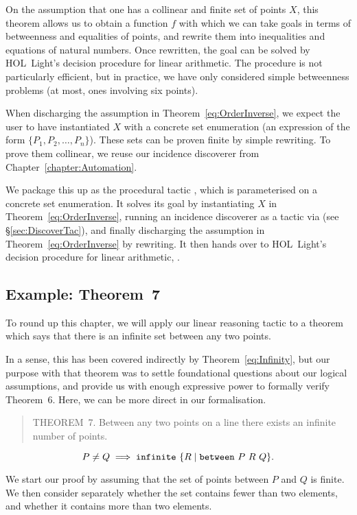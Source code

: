 On the assumption that one has a collinear and finite set of points $X$, this theorem allows us to obtain a function $f$ with which we can take goals in terms of betweenness and equalities of points, and rewrite them into inequalities and equations of natural numbers. Once rewritten, the goal can be solved by HOL~Light's decision procedure for linear arithmetic. The procedure is not particularly efficient, but in practice, we have only considered simple betweenness problems (at most, ones involving six points).

When discharging the assumption in Theorem~\ref{eq:OrderInverse}, we expect the user to have instantiated $X$ with a concrete set enumeration (an expression of the form $\{P_1,P_2,\ldots,P_n\}$). These sets can be proven finite by simple rewriting. To prove them collinear, we reuse our incidence discoverer from Chapter~\ref{chapter:Automation}.

We package this up as the procedural tactic , which is parameterised on a concrete set enumeration. It solves its goal by instantiating $X$ in Theorem~\ref{eq:OrderInverse}, running an incidence discoverer as a tactic via  (see \S\ref{sec:DiscoverTac}), and finally discharging the assumption in Theorem~\ref{eq:OrderInverse} by rewriting. It then hands over to HOL~Light's decision procedure for linear arithmetic, .

\subsection{Example: Theorem~7}
To round up this chapter, we will apply our linear reasoning tactic  to a theorem which says that there is an infinite set between any two points. 

In a sense, this has been covered indirectly by Theorem~\ref{eq:Infinity}, but our purpose with that theorem was to settle foundational questions about our logical assumptions, and provide us with enough expressive power to formally verify Theorem~6. Here, we can be more direct in our formalisation.
\begin{quotation}THEOREM~7. Between any two points on a line there exists an infinite number of points.
\end{quotation}
\begin{equation}
\label{eq:seven}
P\neq Q \implies \texttt{infinite}\ \{R\; \vert\; \texttt{between}\ P\ R\ Q\}.
\end{equation}

We start our proof by assuming that the set of points between $P$ and $Q$ is finite. We then consider separately whether the set contains fewer than two elements, and whether it contains more than two elements. 

